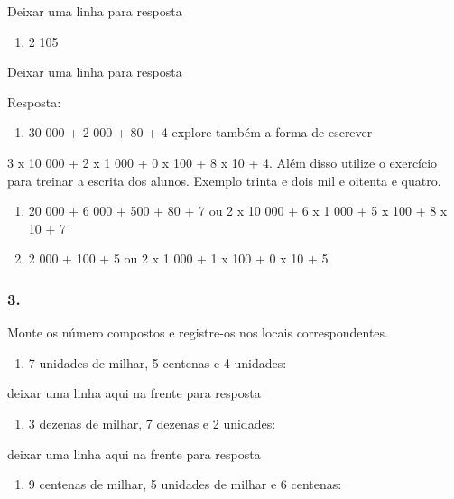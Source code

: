 Deixar uma linha para resposta

\begin{enumerate}
\def\labelenumi{\alph{enumi})}
\item
  2 105
\end{enumerate}

Deixar uma linha para resposta

Resposta:

\begin{enumerate}
\def\labelenumi{\alph{enumi})}
\item
  30 000 + 2 000 + 80 + 4 explore também a forma de escrever
\end{enumerate}

3 x 10 000 + 2 x 1 000 + 0 x 100 + 8 x 10 + 4. Além disso utilize o
exercício para treinar a escrita dos alunos. Exemplo trinta e dois mil e
oitenta e quatro.

\begin{enumerate}
\def\labelenumi{\alph{enumi})}
\item
  20 000 + 6 000 + 500 + 80 + 7 ou 2 x 10 000 + 6 x 1 000 + 5 x 100 + 8
  x 10 + 7
\item
  2 000 + 100 + 5 ou 2 x 1 000 + 1 x 100 + 0 x 10 + 5
\end{enumerate}

\subsubsection{3.}\label{section-2}

Monte os número compostos e registre-os nos locais correspondentes.

\begin{enumerate}
\def\labelenumi{\alph{enumi})}
\item
  7 unidades de milhar, 5 centenas e 4 unidades:
\end{enumerate}

deixar uma linha aqui na frente para resposta

\begin{enumerate}
\def\labelenumi{\alph{enumi})}
\item
  3 dezenas de milhar, 7 dezenas e 2 unidades:
\end{enumerate}

deixar uma linha aqui na frente para resposta

\begin{enumerate}
\def\labelenumi{\alph{enumi})}
\item
  9 centenas de milhar, 5 unidades de milhar e 6 centenas:
\end{enumerate}

